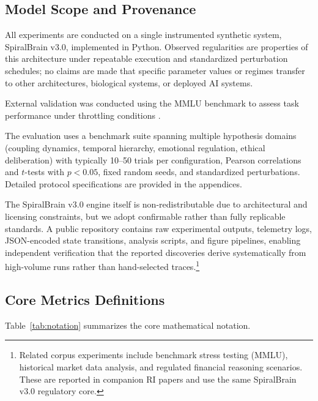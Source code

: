 \documentclass[11pt,a4paper]{article}
\begin{document}
\subsection{Model Scope and Provenance}

All experiments are conducted on a single instrumented synthetic system, SpiralBrain v3.0, implemented in Python. Observed regularities are properties of this architecture under repeatable execution and standardized perturbation schedules; no claims are made that specific parameter values or regimes transfer to other architectures, biological systems, or deployed AI systems.

External validation was conducted using the MMLU benchmark to assess task performance under throttling conditions \cite{mmlu_cognitive_integrity}.

The evaluation uses a benchmark suite spanning multiple hypothesis domains (coupling dynamics, temporal hierarchy, emotional regulation, ethical deliberation) with typically 10--50 trials per configuration, Pearson correlations and \( t \)-tests with \( p < 0.05 \), fixed random seeds, and standardized perturbations. Detailed protocol specifications are provided in the appendices.

The SpiralBrain v3.0 engine itself is non-redistributable due to architectural and licensing constraints, but we adopt confirmable rather than fully replicable standards. A public repository contains raw experimental outputs, telemetry logs, JSON-encoded state transitions, analysis scripts, and figure pipelines, enabling independent verification that the reported discoveries derive systematically from high-volume runs rather than hand-selected traces.\footnote{Related corpus experiments include benchmark stress testing (MMLU), historical market data analysis, and regulated financial reasoning scenarios. These are reported in companion RI papers and use the same SpiralBrain v3.0 regulatory core.}

\subsection{Core Metrics Definitions}

Table~\ref{tab:notation} summarizes the core mathematical notation.
\end{document}
